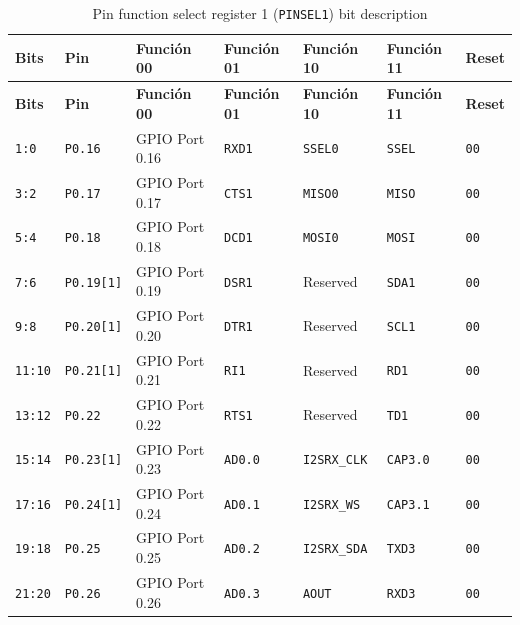 \begin{longtable}{|>{\raggedright\arraybackslash}p{}|>{\raggedright\arraybackslash}p{}|>{\raggedright\arraybackslash}p{}|>{\raggedright\arraybackslash}p{}|>{\raggedright\arraybackslash}p{}|>{\raggedright\arraybackslash}p{}|>{\centering\arraybackslash}p{}|}
\caption{Pin function select register 1 (\texttt{PINSEL1}) bit description}\\
\hline
\textbf{Bits} & \textbf{Pin} & \textbf{Función 00} & \textbf{Función 01} & \textbf{Función 10} & \textbf{Función 11} & \textbf{Reset} \\
\hline
\endfirsthead
\hline
\textbf{Bits} & \textbf{Pin} & \textbf{Función 00} & \textbf{Función 01} & \textbf{Función 10} & \textbf{Función 11} & \textbf{Reset} \\
\hline
\endhead
\texttt{1:0} & \texttt{P0.16} & GPIO Port 0.16 & \texttt{RXD1} & \texttt{SSEL0} & \texttt{SSEL} & \texttt{00} \\
\hline
\texttt{3:2} & \texttt{P0.17} & GPIO Port 0.17 & \texttt{CTS1} & \texttt{MISO0} & \texttt{MISO} & \texttt{00} \\
\hline
\texttt{5:4} & \texttt{P0.18} & GPIO Port 0.18 & \texttt{DCD1} & \texttt{MOSI0} & \texttt{MOSI} & \texttt{00} \\
\hline
\texttt{7:6} & \texttt{P0.19[1]} & GPIO Port 0.19 & \texttt{DSR1} & Reserved & \texttt{SDA1} & \texttt{00} \\
\hline
\texttt{9:8} & \texttt{P0.20[1]} & GPIO Port 0.20 & \texttt{DTR1} & Reserved & \texttt{SCL1} & \texttt{00} \\
\hline
\texttt{11:10} & \texttt{P0.21[1]} & GPIO Port 0.21 & \texttt{RI1} & Reserved & \texttt{RD1} & \texttt{00} \\
\hline
\texttt{13:12} & \texttt{P0.22} & GPIO Port 0.22 & \texttt{RTS1} & Reserved & \texttt{TD1} & \texttt{00} \\
\hline
\texttt{15:14} & \texttt{P0.23[1]} & GPIO Port 0.23 & \texttt{AD0.0} & \texttt{I2SRX\_CLK} & \texttt{CAP3.0} & \texttt{00} \\
\hline
\texttt{17:16} & \texttt{P0.24[1]} & GPIO Port 0.24 & \texttt{AD0.1} & \texttt{I2SRX\_WS} & \texttt{CAP3.1} & \texttt{00} \\
\hline
\texttt{19:18} & \texttt{P0.25} & GPIO Port 0.25 & \texttt{AD0.2} & \texttt{I2SRX\_SDA} & \texttt{TXD3} & \texttt{00} \\
\hline
\texttt{21:20} & \texttt{P0.26} & GPIO Port 0.26 & \texttt{AD0.3} & \texttt{AOUT} & \texttt{RXD3} & \texttt{00} \\

\end{longtable}
